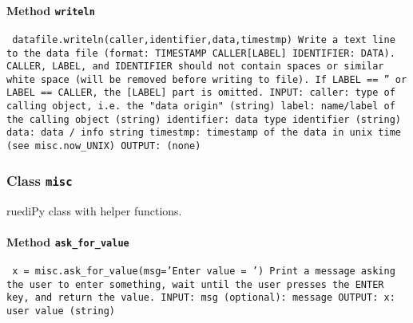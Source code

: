 \paragraph{Method \texttt{writeln}}
\vspace{1ex}
\texttt{\newline
datafile.writeln(caller,identifier,data,timestmp)\newline
\newline
Write a text line to the data file (format: TIMESTAMP CALLER[LABEL] IDENTIFIER: DATA). CALLER, LABEL, and IDENTIFIER should not contain spaces or similar white space (will be removed before writing to file). If LABEL == '' or LABEL == CALLER, the [LABEL] part is omitted.\newline
\newline
INPUT:\newline
caller: type of calling object, i.e. the "data origin" (string)\newline
label: name/label of the calling object (string)\newline
identifier: data type identifier (string)\newline
data: data / info string\newline
timestmp: timestamp of the data in unix time (see misc.now_UNIX)\newline
\newline
OUTPUT:\newline
(none)\newline
\newline
}

\subsubsection{Class \texttt{misc}}
\par
ruediPy class with helper functions.\par

\paragraph{Method \texttt{ask_for_value}}
\vspace{1ex}
\texttt{\newline
x = misc.ask_for_value(msg='Enter value = ')\newline
\newline
Print a message asking the user to enter something, wait until the user presses the ENTER key, and return the value.\newline
\newline
INPUT:\newline
msg (optional): message\newline
\newline
OUTPUT:\newline
x: user value (string)\newline
\newline
}

